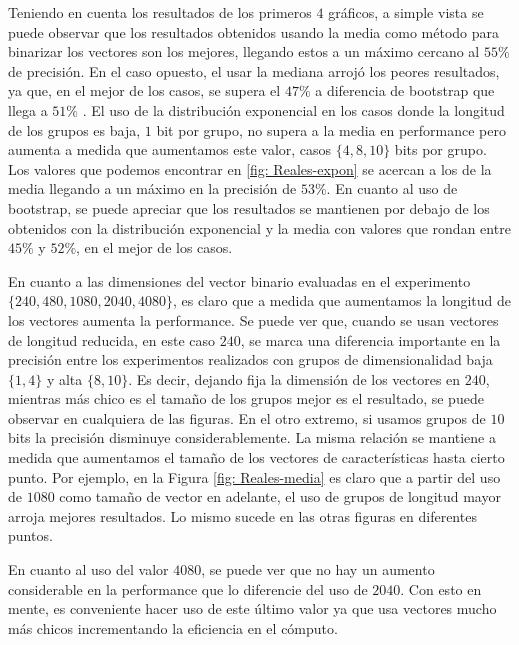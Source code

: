 	Teniendo en cuenta los resultados de los primeros $4$ gráficos, a simple vista se puede observar que los resultados obtenidos usando la media como método para binarizar los vectores son los mejores, llegando estos a un máximo cercano al $55\%$ de precisión. En el caso opuesto, el usar la mediana arrojó los peores resultados, ya que, en el mejor de los casos, se supera el $47\%$ a diferencia de bootstrap que llega a $51\%$ . El uso de la distribución exponencial en los casos donde la longitud de los grupos es baja, $1$ bit por grupo, no supera a la media en performance pero aumenta a medida que aumentamos este valor, casos $\{ 4, 8, 10\}$ bits por grupo. Los valores que podemos encontrar en \ref{fig: Reales-expon} se acercan a los de la media llegando a un máximo en la precisión de $53\%$. En cuanto al uso de bootstrap, se puede apreciar que los resultados se mantienen por debajo de los obtenidos con la distribución exponencial y la media con valores que rondan entre $45\%$ y $52\%$, en el mejor de los casos.

	En cuanto a las dimensiones del vector binario evaluadas en el ex\-pe\-ri\-men\-to $\{ 240, 480, 1080, 2040, 4080 \}$, es claro que a medida que aumentamos la longitud de los vectores aumenta la performance. Se puede ver que, cuando se usan vectores de longitud reducida, en este caso $240$, se marca una diferencia importante en la precisión entre los experimentos realizados con grupos de dimensionalidad baja $\{ 1, 4 \}$ y alta $\{8, 10\}$. Es decir, dejando fija la dimensión de los vectores en $240$, mientras más chico es el tamaño de los grupos mejor es el resultado, se puede observar en cualquiera de las figuras. En el otro extremo, si usamos grupos de $10$ bits la precisión disminuye considerablemente. La misma relación se mantiene a medida que aumentamos el tamaño de los vectores de características hasta cierto punto. Por ejemplo, en la Figura \ref{fig: Reales-media} es claro que a partir del uso de $1080$ como tamaño de vector en adelante, el uso de grupos de longitud mayor arroja mejores resultados. Lo mismo sucede en las otras figuras en diferentes puntos.

	En cuanto al uso del valor $4080$, se puede ver que no hay un aumento considerable en la performance que lo diferencie del uso de $2040$. Con esto en mente, es conveniente hacer uso de este último valor ya que usa vectores mucho más chicos incrementando la eficiencia en el cómputo.

